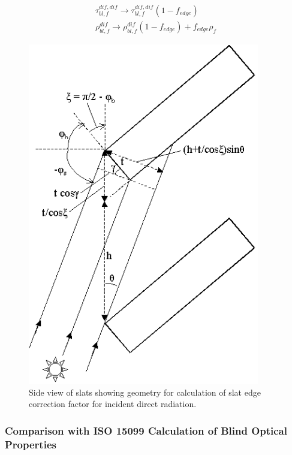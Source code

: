 \begin{equation}
\begin{array}{l}\tau_{bl,f}^{dif,dif} \to \tau_{bl,f}^{dif,dif}\left( {1 - {f_{edge}}} \right)\\\rho_{bl,f}^{dif} \to \rho_{bl,f}^{dif}\left( {1 - {f_{edge}}} \right) + {f_{edge}}{\rho_f}\end{array}
\end{equation}

\begin{figure}[hbtp] %
\centering
\includegraphics[width=0.9\textwidth, height=0.9\textheight, keepaspectratio=true]{media/image1100.png}
\caption{Side view of slats showing geometry for calculation of slat edge correction factor for incident direct radiation. \protect \label{fig:side-view-of-slats-showing-geometry-for}}
\end{figure}

\subsubsection{Comparison with ISO 15099 Calculation of Blind Optical Properties}\label{comparison-with-iso-15099-calculation-of-blind-optical-properties}

